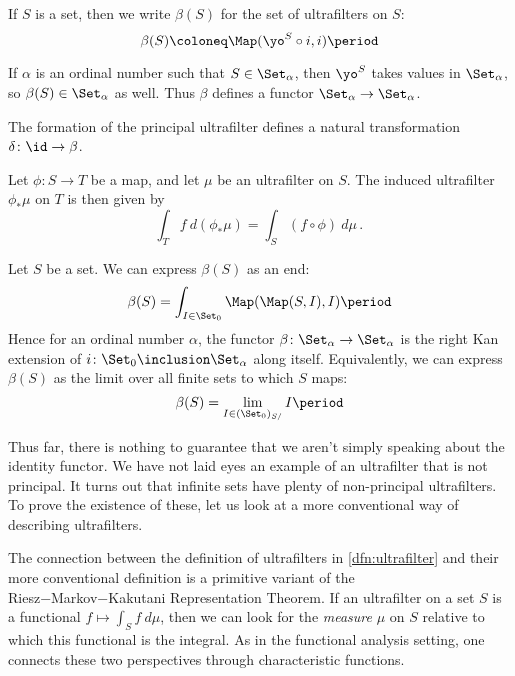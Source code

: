 \begin{notation}
	If $ S $ is a set, then
	we write $ \beta(S) $ for the set
	of ultrafilters on $ S $:
	\[ \beta(S) \coloneq \Map(\yo^S \circ i, i) \period \]

	If $ \alpha $ is an ordinal number such that
	$ S \in \Set_{\alpha} $, then $ \yo^S $
	takes values in $ \Set_{\alpha} $,
	so $ \beta(S) \in \Set_{\alpha} $ as well.
	Thus $ \beta $ defines a functor
	$ \Set_{\alpha} \to \Set_{\alpha} $.

	The formation of the principal ultrafilter
	defines a natural transformation
	$ \delta \colon \id \to \beta $.
\end{notation}

\begin{nul}
	Let $ \phi \colon S \to T $ be a map,
	and let $ \mu $ be an ultrafilter on $ S $.
	The induced ultrafilter $ \phi_{\ast}\mu $ on $ T $
	is then given by
	\[
		\int_T f \ d (\phi_{\ast}\mu) =
		\int_S (f \circ \phi) \ d \mu \period
	\]
\end{nul}

\begin{nul}
	Let $ S $ be a set.
	We can express $ \beta(S) $ as an end:
	\[
		\beta(S) =
		\int_{I \in \Set_0} \Map(\Map(S,I),I) \period
	\]
	Hence for an ordinal number $ \alpha $,
	the functor $ \beta \colon \Set_{\alpha} \to \Set_{\alpha} $
	is the right Kan extension of
	$ i \colon \Set_0 \inclusion \Set_{\alpha} $
	along itself.
	Equivalently, we can express $ \beta(S) $
	as the limit over all finite sets
	to which $ S $ maps:
	\[ \beta(S) = \lim_{I \in (\Set_0)_{S/}} I \period \]
\end{nul}

Thus far, there is nothing to guarantee that we aren't
simply speaking about the identity functor.
We have not laid eyes an example of an ultrafilter
that is not principal.
It turns out that infinite sets have plenty of
non-principal ultrafilters.
To prove the existence of these,
let us look at a more conventional way
of describing ultrafilters.

The connection between
the definition of ultrafilters in \ref{dfn:ultrafilter} and
their more conventional definition
is a primitive variant of
the Riesz−Markov−Kakutani Representation Theorem.
If an ultrafilter on a set $ S $ is
a functional $ f \mapsto \int_S f \ d \mu $,
then we can look for the \emph{measure} $ \mu $ on $ S $
relative to which this functional is the integral.
As in the functional analysis setting,
one connects these two perspectives through
characteristic functions.

